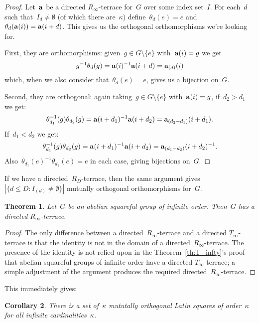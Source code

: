 \documentclass[12pt,a4paper]{article}
\newtheorem{thm}{Theorem}[section]
\newtheorem{cor}[thm]{Corollary}
\begin{document}
\begin{proof}
Let~${\bf a}$ be a directed $R_{\infty}$-terrace for~$G$ over some index set~$I$.  For each~$d$ such that~$I_d \neq \emptyset$ (of which there are~$\kappa$) define~$\theta_d(e) = e$ and $\theta_d( {\bf a}(i) ) = {\bf a}(i+d)$.  This gives us the orthogonal orthomorphisms we're looking for.

First, they are orthomorphisms: given~$g \in G \setminus \{ e \}$ with~${\bf a}(i) = g$ we get
$$g^{-1}\theta_d(g) = {\bf a}(i)^{-1}{\bf a}(i+d) = {\bf a}_{(d)}(i)$$
which, when we also consider that~$\theta_d(e)=e$, gives us a bijection on~$G$.

Second, they are orthogonal: again taking~$g \in G \setminus \{ e \}$ with~${\bf a}(i) = g$, if~$d_2 > d_1$ we get: 
$$\theta_{d_1}^{-1}(g) \theta_{d_2}(g) =  {\bf a}(i+d_1)^{-1}{\bf a}(i+d_2)  = {\bf a}_{(d_2 - d_1)}(i+d_1) .       $$
If~$d_1 < d_2$ we get:
$$\theta_{d_1}^{-1}(g) \theta_{d_2}(g) =  {\bf a}(i+d_1)^{-1}{\bf a}(i+d_2)  = {\bf a}_{(d_1 - d_2)}(i+d_2)^{-1} .       $$
Also~$\theta_{d_1}(e)^{-1}\theta_{d_2}(e) =e$ in each case, giving bijections on~$G$.
\end{proof}

If we have a directed~$R_D$-terrace, then the same argument gives $ | \{ d \leq D : I_{(d)} \neq \emptyset \} |$ mutually orthogonal orthomorphisms for~$G$.

\begin{thm}\label{th:R_infty}
Let~$G$ be an abelian squareful group of infinite order.   Then~$G$ has a directed $R_{\infty}$-terrace.
\end{thm}

\begin{proof}
The only difference between a directed~$R_{\infty}$-terrace and a directed $T_{\infty}$-terrace is that the identity is not in the domain of a directed~$R_{\infty}$-terrace.  The presence of the identity is not relied upon in the Theorem~\ref{th:T_infty}'s proof that abelian squareful groups of infinite order have a  directed $T_{\infty}$ terrace; a simple adjustment of the argument produces the required directed~$R_{\infty}$-terrace.
\end{proof}

This immediately gives:

\begin{cor}
There is a set of~$\kappa$ mututally orthogonal Latin squares of order~$\kappa$ for all infinite cardinalities~$\kappa$.
\end{cor}
\end{document}
